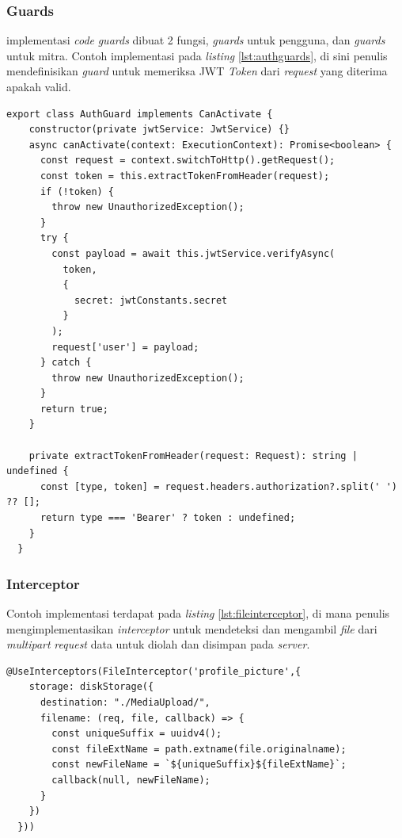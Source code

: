 \subsubsection{Guards}
implementasi \textit{code} \textit{guards} dibuat 2 fungsi, \textit{guards} untuk pengguna, dan \textit{guards} untuk mitra. Contoh implementasi pada \textit{listing} \ref{lst:authguards}, di sini penulis mendefinisikan \textit{guard} untuk memeriksa JWT \textit{Token} dari \textit{request} yang diterima apakah valid.
\begin{lstlisting}[caption={Authentication Guards}, label={lst:authguards}]
  export class AuthGuard implements CanActivate {
    constructor(private jwtService: JwtService) {}
    async canActivate(context: ExecutionContext): Promise<boolean> {
      const request = context.switchToHttp().getRequest();
      const token = this.extractTokenFromHeader(request);
      if (!token) {
        throw new UnauthorizedException();
      }
      try {
        const payload = await this.jwtService.verifyAsync(
          token,
          {
            secret: jwtConstants.secret
          }
        );
        request['user'] = payload;
      } catch {
        throw new UnauthorizedException();
      }
      return true;
    }
  
    private extractTokenFromHeader(request: Request): string | undefined {
      const [type, token] = request.headers.authorization?.split(' ') ?? [];
      return type === 'Bearer' ? token : undefined;
    }
  }
\end{lstlisting}

\subsubsection{Interceptor}
Contoh implementasi terdapat pada \textit{listing} \ref{lst:fileinterceptor}, di mana penulis mengimplementasikan \textit{interceptor} untuk mendeteksi dan mengambil \textit{file} dari \textit{multipart} \textit{request} data untuk diolah dan disimpan pada \textit{server}.
\begin{lstlisting}[caption={File Interceptor},label={lst:fileinterceptor}]
  @UseInterceptors(FileInterceptor('profile_picture',{
    storage: diskStorage({
      destination: "./MediaUpload/",
      filename: (req, file, callback) => {
        const uniqueSuffix = uuidv4();
        const fileExtName = path.extname(file.originalname);
        const newFileName = `${uniqueSuffix}${fileExtName}`;
        callback(null, newFileName);
      }
    })
  }))
\end{lstlisting}

